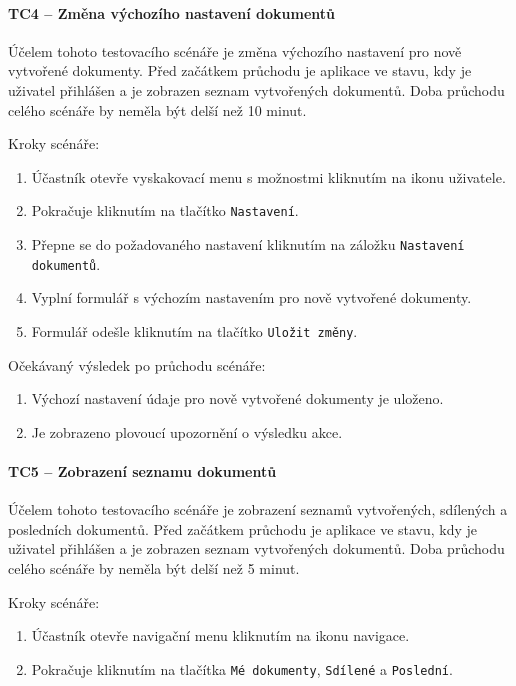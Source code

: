\paragraph{TC4 -- Změna výchozího nastavení dokumentů}

Účelem tohoto testovacího scénáře je změna výchozího nastavení pro nově vytvořené dokumenty.
Před začátkem průchodu je aplikace ve stavu, kdy je uživatel přihlášen a je zobrazen seznam vytvořených dokumentů.
Doba průchodu celého scénáře by neměla být delší než 10 minut.

Kroky scénáře:
\begin{enumerate}
    \item Účastník otevře vyskakovací menu s možnostmi kliknutím na ikonu uživatele.
    \item Pokračuje kliknutím na tlačítko \texttt{Nastavení}.
    \item Přepne se do požadovaného nastavení kliknutím na záložku \texttt{Nastavení dokumentů}.
    \item Vyplní formulář s výchozím nastavením pro nově vytvořené dokumenty.
    \item Formulář odešle kliknutím na tlačítko \texttt{Uložit změny}.
\end{enumerate}

Očekávaný výsledek po průchodu scénáře:
\begin{enumerate}
    \item Výchozí nastavení údaje pro nově vytvořené dokumenty je uloženo.
    \item Je zobrazeno plovoucí upozornění o výsledku akce.
\end{enumerate}


\paragraph{TC5 -- Zobrazení seznamu dokumentů}

Účelem tohoto testovacího scénáře je zobrazení seznamů vytvořených, sdílených a posledních dokumentů.
Před začátkem průchodu je aplikace ve stavu, kdy je uživatel přihlášen a je zobrazen seznam vytvořených dokumentů.
Doba průchodu celého scénáře by neměla být delší než 5 minut.

Kroky scénáře:
\begin{enumerate}
    \item Účastník otevře navigační menu kliknutím na ikonu navigace.
    \item Pokračuje kliknutím na tlačítka \texttt{Mé dokumenty}, \texttt{Sdílené} a \texttt{Poslední}.
\end{enumerate}

